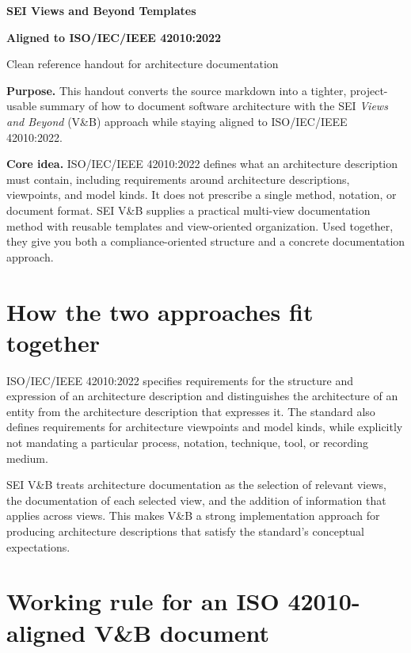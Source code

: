 \documentclass[11pt]{article}
\begin{document}
{\LARGE\bfseries\color{titleblue}SEI Views and Beyond Templates\par}
{\LARGE\bfseries\color{titleblue}Aligned to ISO/IEC/IEEE 42010:2022\par}
\vspace{0.5em}
{\large Clean reference handout for architecture documentation\par}
\vspace{0.75em}
\noindent{\color{rulegray}\rule{\textwidth}{1pt}}
\vspace{0.5em}

\textbf{Purpose.} This handout converts the source markdown into a tighter, project-usable summary of how to document software architecture with the SEI \emph{Views and Beyond} (V\&B) approach while staying aligned to ISO/IEC/IEEE 42010:2022.

\textbf{Core idea.} ISO/IEC/IEEE 42010:2022 defines what an architecture description must contain, including requirements around architecture descriptions, viewpoints, and model kinds. It does not prescribe a single method, notation, or document format. SEI V\&B supplies a practical multi-view documentation method with reusable templates and view-oriented organization. Used together, they give you both a compliance-oriented structure and a concrete documentation approach.

\section{How the two approaches fit together}

ISO/IEC/IEEE 42010:2022 specifies requirements for the structure and expression of an architecture description and distinguishes the architecture of an entity from the architecture description that expresses it. The standard also defines requirements for architecture viewpoints and model kinds, while explicitly not mandating a particular process, notation, technique, tool, or recording medium.

SEI V\&B treats architecture documentation as the selection of relevant views, the documentation of each selected view, and the addition of information that applies across views. This makes V\&B a strong implementation approach for producing architecture descriptions that satisfy the standard's conceptual expectations.

\section{Working rule for an ISO 42010-aligned V\&B document}
\end{document}
